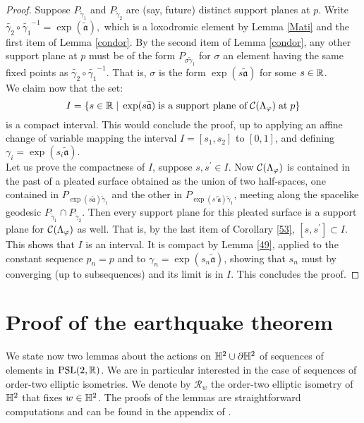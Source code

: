\begin{proof}
Suppose $P_{\widetilde{\gamma}_1}$ and $P_{\widetilde{\gamma}_2}$ are (say, future) distinct support planes at $p$. Write $\widetilde{\gamma_2}\circ\widetilde{\gamma_1}^{-1}=\exp(\widetilde{\mathfrak{a}}),$ which is a loxodromic element by Lemma \ref{Mati} and the first item of Lemma \ref{condor}. By the second item of Lemma \ref{condor}, any other support plane at $p$ must be of the form $P_{\sigma\widetilde{\gamma}_1}$ for $\sigma$ an element having the same fixed points as $\widetilde{\gamma_2}\circ\widetilde{\gamma_1}^{-1}$. That is, $\sigma$ is the form $\exp(s\widetilde{\mathfrak{a}})$ for some $s\in\mathbb{R}$.\\
We claim now that the set: 
\[
    I=\{s\in\mathbb{R}\;|\;\exp(s\widetilde{\mathfrak{a}})\;\text{is a support plane of}\;\mathcal{C}(\Lambda_\varphi)\;\text{at}\;p\}
\]
is a compact interval. This would conclude the proof, up to applying an affine change of variable mapping the interval $I=[s_1,s_2]$ to $[0,1]$, and defining $\gamma_i=\exp(s_i\widetilde{\mathfrak{a}}).$\\
Let us prove the compactness of $I$, suppose $s,s^{\prime} \in I$. Now $\mathcal{C}(\Lambda_\varphi)$ is contained in the past of a pleated surface obtained as the union of two half-spaces, one contained in $P_{\exp(s\widetilde{\mathfrak{a}})\widetilde{\gamma}_1}$ and the other in $P_{\exp(s^{\prime}\widetilde{\mathfrak{a}})\widetilde{\gamma}_1}$, meeting along the spacelike geodesic $P_{\widetilde{\gamma}_1}\cap P_{\widetilde{\gamma}_2}$. Then every support plane for this pleated surface is a support plane for $\mathcal{C}(\Lambda_\varphi)$ as well. That is, by the last item of Corollary \ref{53}, $[s,s^{\prime}]\subset I$. This shows that $I$ is an interval. It is compact by Lemma \ref{49}, applied to the constant sequence $p_n=p$ and to $\gamma_n=\exp(s_n\widetilde{\mathfrak{a}})$, showing that $s_n$ must by converging (up to subsequences) and its limit is in $I$. This concludes the proof.  

\end{proof}

\section{Proof of the earthquake theorem}

We state now two lemmas about the actions on $\mathbb{H}^2\cup\partial\mathbb{H}^2$ of sequences of elements in $\text{PSL}(2,\mathbb{R})$. We are in particular interested in the case of sequences of order-two elliptic isometries. We denote by $\mathcal{R}_w$ the order-two elliptic isometry of $\mathbb{H}^2$ that fixes $w\in\mathbb{H}^2$. The proofs of the lemmas are straightforward computations and can be found in the appendix of \cite{diaf2023anti}. 


